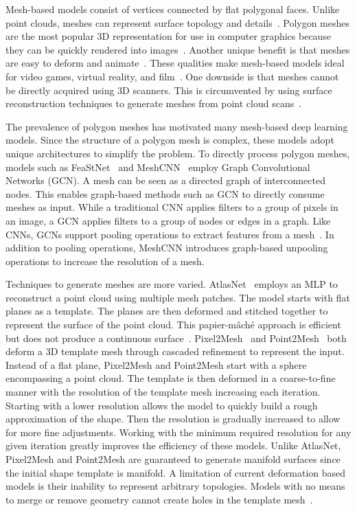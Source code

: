 Mesh-based models consist of vertices connected by flat polygonal faces. Unlike point clouds, meshes can represent surface topology and details~\cite{Xiao2020}. Polygon meshes are the most popular 3D representation for use in computer graphics because they can be quickly rendered into images~\cite{Watt1996}. Another unique benefit is that meshes are easy to deform and animate~\cite{Wang2018}. These qualities make mesh-based models ideal for video games, virtual reality, and film~\cite{Nash2020}. One downside is that meshes cannot be directly acquired using 3D scanners. This is circumvented by using surface reconstruction techniques to generate meshes from point cloud scans~\cite{Yuan2022}.

The prevalence of polygon meshes has motivated many mesh-based deep learning models. Since the structure of a polygon mesh is complex, these models adopt unique architectures to simplify the problem. To directly process polygon meshes, models such as FeaStNet~\cite{Verma2018} and MeshCNN~\cite{Hanocka2019} employ Graph Convolutional Networks (GCN). A mesh can be seen as a directed graph of interconnected nodes. This enables graph-based methods such as GCN to directly consume meshes as input. While a traditional CNN applies filters to a group of pixels in an image, a GCN applies filters to a group of nodes or edges in a graph. Like CNNs, GCNs support pooling operations to extract features from a mesh~\cite{Verma2018}. In addition to pooling operations, MeshCNN introduces graph-based unpooling operations to increase the resolution of a mesh.

Techniques to generate meshes are more varied. AtlasNet~\cite{Groueix2018} employs an MLP to reconstruct a point cloud using multiple mesh patches. The model starts with flat planes as a template. The planes are then deformed and stitched together to represent the surface of the point cloud. This papier-m{\^a}ch{\'e} approach is efficient but does not produce a continuous surface~\cite{Groueix2018}. Pixel2Mesh~\cite{Wang2018} and Point2Mesh~\cite{Hanocka2020} both deform a 3D template mesh through cascaded refinement to represent the input. Instead of a flat plane, Pixel2Mesh and Point2Mesh start with a sphere encompassing a point cloud. The template is then deformed in a coarse-to-fine manner with the resolution of the template mesh increasing each iteration. Starting with a lower resolution allows the model to quickly build a rough approximation of the shape. Then the resolution is gradually increased to allow for more fine adjustments. Working with the minimum required resolution for any given iteration greatly improves the efficiency of these models. Unlike AtlasNet, Pixel2Mesh and Point2Mesh are guaranteed to generate manifold surfaces since the initial shape template is manifold. A limitation of current deformation based models is their inability to represent arbitrary topologies. Models with no means to merge or remove geometry cannot create holes in the template mesh~\cite{Wang2018, Hanocka2020}.

